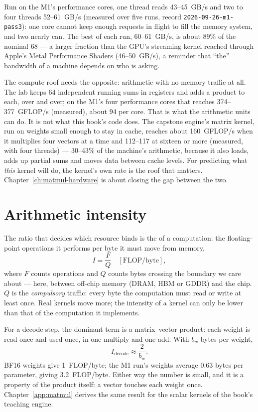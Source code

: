 
\noindent Run on the M1's performance cores, one thread reads 43--45~GB/s and
two to four threads 52--61~GB/s (measured over five runs, record
\texttt{2026-09-26-m1-pass3}): one core cannot keep enough requests in flight
to fill the memory system, and two nearly can. The best of each run, 60--61~GB/s,
is about 89\% of the nominal 68 --- a larger fraction than the GPU's streaming
kernel reached through Apple's Metal Performance Shaders (46--50~GB/s), a
reminder that ``the'' bandwidth of a machine depends on who is asking.

The compute roof needs the opposite: arithmetic with no memory traffic at all.
The lab keeps 64 independent running sums in registers and adds a product to
each, over and over; on the M1's four performance cores that reaches
374--377~GFLOP/s (measured), about 94 per core. That is what the arithmetic
units can do. It is not what this book's code does. The capstone engine's
matrix kernel, run on weights small enough to stay in cache, reaches about
160~GFLOP/s when it multiplies four vectors at a time and 112--117 at sixteen
or more (measured, with four threads) --- 30--43\% of the machine's
arithmetic, because it also loads, adds up partial sums and moves data between
cache levels. For predicting what \emph{this} kernel will do, the kernel's own
rate is the roof that matters. Chapter~\ref{ch:matmul-hardware} is about
closing the gap between the two.

\section{Arithmetic intensity}

The ratio that decides which resource binds is the 
of a computation: the floating-point operations it performs per byte it must
move from memory,
\begin{equation}
I = \frac{F}{Q}\quad[\text{FLOP/byte}],
\label{eq:intensity}
\end{equation}
where $F$ counts operations and $Q$ counts bytes crossing the boundary we care
about --- here, between off-chip memory (DRAM, HBM or GDDR) and the chip. $Q$
is the \emph{compulsory} traffic: every byte the computation must read or write
at least once. Real kernels move more; the intensity of a kernel can only be
lower than that of the computation it implements.

For a decode step, the dominant term is a matrix--vector product: each weight
is read once and used once, in one multiply and one add. With $b_w$ bytes per
weight,
\begin{equation}
I_{\text{decode}} \approx \frac{2}{b_w}.
\label{eq:intensity-decode}
\end{equation}
BF16 weights give 1~FLOP/byte; the M1 run's weights average 0.63 bytes per
parameter, giving 3.2~FLOP/byte. Either way the number is small, and it is a
property of the product itself: a vector touches each weight once.
Chapter~\ref{app:matmul} derives the same result for the scalar kernels of the
book's teaching engine.

